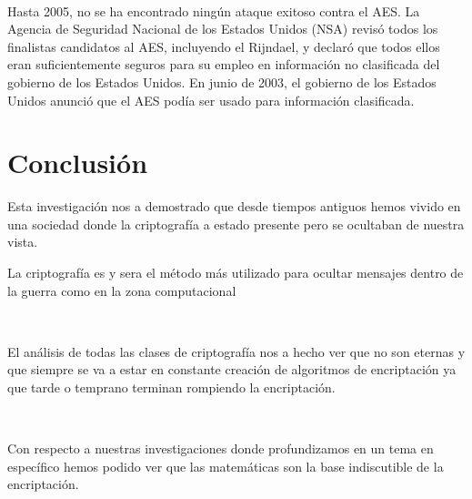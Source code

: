 \documentclass[11pt, conference]{IEEEtran}
\begin{document}
\

Hasta 2005, no se ha encontrado ningún ataque exitoso contra el AES. La Agencia de Seguridad Nacional de los Estados Unidos (NSA) revisó todos los finalistas candidatos al AES, incluyendo el Rijndael, y declaró que todos ellos eran suficientemente seguros para su empleo en información no clasificada del gobierno de los Estados Unidos. En junio de 2003, el gobierno de los Estados Unidos anunció que el AES podía ser usado para información clasificada.

\section{Conclusión}
Esta investigación nos a demostrado que desde tiempos antiguos hemos vivido en una sociedad donde la criptografía a estado presente pero se ocultaban de nuestra vista.

La criptografía es y sera el método más utilizado para ocultar mensajes dentro de la guerra como en la zona computacional

\

El análisis de todas las clases de criptografía nos a hecho ver que no son eternas y que siempre se va a estar en constante creación de algoritmos de encriptación ya que tarde o temprano terminan rompiendo la encriptación.

\

Con respecto a nuestras investigaciones donde profundizamos en un tema en específico hemos podido ver que las matemáticas son la base indiscutible de la encriptación.
\bigskip\bigskip\bigskip\bigskip\bigskip
\bigskip\bigskip\bigskip\bigskip\bigskip
\bigskip\bigskip\bigskip\bigskip\bigskip

\pagebreak

\onecolumn




\bigskip\bigskip\bigskip\bigskip\bigskip
\bigskip\bigskip\bigskip\bigskip


\pagebreak



\listoffigures
\end{document}
